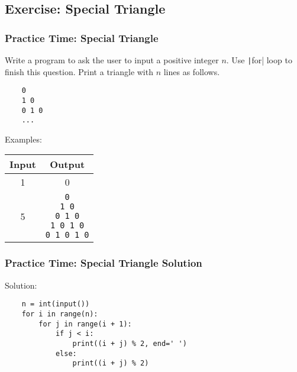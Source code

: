 \documentclass{beamer}
\newcommand{\python}[1]{\texttt|#1|}
\begin{document}
\subsection{Exercise: Special Triangle}
\begin{frame}[fragile]
    \frametitle{Practice Time: Special Triangle}

    Write a program to ask the user to input a positive integer $n$.
    Use \python{for} loop to finish this question.
    Print a triangle with $n$ lines as follows.
    \begin{verbatim}
    0
    1 0
    0 1 0
    ...
    \end{verbatim}

    Examples:

    \begin{center}
        \begin{tabular}{|c|c|}
            \hline
            Input & Output     \\ \hline
            1     & 0          \\ \hline
            5     &
            \makecell[tl]{
            \texttt{0}         \\
            \texttt{1 0}       \\
            \texttt{0 1 0}     \\
            \texttt{1 0 1 0}   \\
            \texttt{0 1 0 1 0} \\
            }
            \\ \hline
        \end{tabular}
    \end{center}
\end{frame}
\begin{frame}[fragile]
    \frametitle{Practice Time: Special Triangle Solution}

    Solution:

    \begin{verbatim}
    n = int(input())
    for i in range(n):
        for j in range(i + 1):
            if j < i:
                print((i + j) % 2, end=' ')
            else:
                print((i + j) % 2)
    \end{verbatim}
\end{frame}
\end{document}
